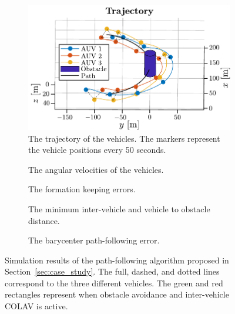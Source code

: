 \begin{figure}[p]
    \centering
    \begin{subfigure}{0.9\textwidth}
        \centering
       \includegraphics[width=.75\linewidth]{figures/handpos_nsb/3d_plot_alternative_view.pdf}
       \caption{The trajectory of the vehicles. The markers represent the vehicle positions every 50 seconds.}
       \label{fig:3d_plot}
   \end{subfigure}
    \begin{subfigure}[t]{.48\textwidth}
    \centering
    \def\figurewidth{.75\linewidth}
    \def\figureheight{2.5cm}
    
    \vspace*{-6.7mm}
    \caption{The angular velocities of the vehicles. }
    \label{fig:angular_velocities}
    \end{subfigure}
    \begin{subfigure}[t]{.48\textwidth}
    \centering
    \def\figurewidth{.75\linewidth}
    \def\figureheight{2.5cm}
    
    \vspace*{-6.7mm}
    \caption{The formation keeping errors. }
    \label{fig:formation_keeping_error}
    \end{subfigure}
    \begin{subfigure}[t]{.48\textwidth}
    \centering
    \def\figurewidth{.75\linewidth}
    \def\figureheight{2.5cm}
    
    \vspace*{-1.8mm}
    \caption{The minimum inter-vehicle and vehicle to obstacle distance.}
    \label{fig:collision_avoidance}
    \end{subfigure}
    \begin{subfigure}[t]{.48\textwidth}
    \centering
    \def\figurewidth{.75\linewidth}
    \def\figureheight{2.5cm}
    
    \vspace*{-6.7mm}
    \caption{The barycenter path-following error.}
    \label{fig:path_following_error}
    \end{subfigure}
    \caption{Simulation results of the path-following algorithm proposed in Section~\ref{sec:case_study}. The full, dashed, and dotted lines correspond to the three different vehicles. The green and red rectangles represent when obstacle avoidance and inter-vehicle COLAV is active.}
    \label{fig:sim_results}
\end{figure}

